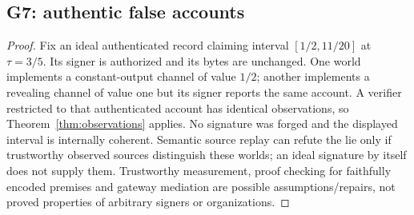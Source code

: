 \subsection{G7: authentic false accounts}
\begin{proof}
Fix an ideal authenticated record claiming interval $[1/2,11/20]$ at
$\tau=3/5$. Its signer is authorized and its bytes are unchanged.
One world implements a constant-output channel of value $1/2$; another
implements a revealing channel of value one but its signer reports the same
account. A verifier restricted to that authenticated account has identical
observations, so Theorem~\ref{thm:observations} applies.
No signature was forged and the displayed interval is internally coherent.
Semantic source replay can refute the lie only if trustworthy observed sources
distinguish these worlds; an ideal signature by itself does not supply them.
Trustworthy measurement, proof checking for faithfully encoded premises and
gateway mediation are possible assumptions/repairs, not proved properties of
arbitrary signers or organizations.
\end{proof}
